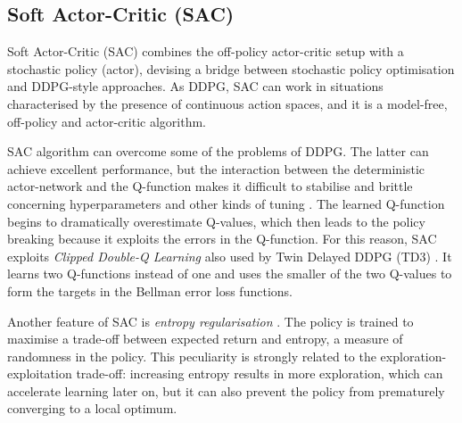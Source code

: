 %		
%		

\subsection{Soft Actor-Critic (SAC)} \label{sac}

Soft Actor-Critic (SAC) \cite{haarnoja2018soft, haarnoja2018alg} combines the off-policy actor-critic setup with a stochastic policy (actor), devising a bridge between stochastic policy optimisation and DDPG-style approaches.
As DDPG, SAC can work in situations characterised by the presence of continuous action spaces, and it is a model-free, off-policy and actor-critic algorithm.

SAC algorithm can overcome some of the problems of DDPG.
The latter can achieve excellent performance, but the interaction between the deterministic actor-network and the Q-function makes it difficult to stabilise and brittle concerning hyperparameters and other kinds of tuning \cite{duan2016benchmarking,henderson2018deep}. The learned Q-function begins to dramatically overestimate Q-values, which then leads to the policy breaking because it exploits the errors in the Q-function. For this reason, SAC exploits \textit{Clipped Double-Q Learning} also used by Twin Delayed DDPG (TD3) \cite{fujimoto2018addressing}. It learns two Q-functions instead of one and uses the smaller of the two Q-values to form the targets in the Bellman error loss functions.

Another feature of SAC is \textit{entropy regularisation} \cite{ziebart2008maximum, toussaint2009robot, rawlik2013stochastic, fox2015taming, haarnoja2017reinforcement}. The policy is trained to maximise a trade-off between expected return and entropy, a measure of randomness in the policy. This peculiarity is strongly related to the exploration-exploitation trade-off: increasing entropy results in more exploration, which can accelerate learning later on, but it can also prevent the policy from prematurely converging to a local optimum.



